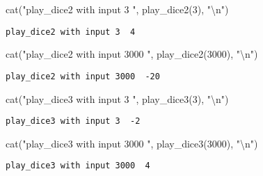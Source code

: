 \documentclass[
  letterpaper,
  DIV=11,
  numbers=noendperiod]{scrartcl}
\newenvironment{Shaded}{\begin{snugshade}}{\end{snugshade}}
\newcommand{\DecValTok}[1]{\textcolor[rgb]{0.68,0.00,0.00}{#1}}
\newcommand{\FunctionTok}[1]{\textcolor[rgb]{0.28,0.35,0.67}{#1}}
\newcommand{\NormalTok}[1]{\textcolor[rgb]{0.00,0.23,0.31}{#1}}
\newcommand{\SpecialCharTok}[1]{\textcolor[rgb]{0.37,0.37,0.37}{#1}}
\newcommand{\StringTok}[1]{\textcolor[rgb]{0.13,0.47,0.30}{#1}}
\begin{document}
\begin{Shaded}
\begin{Highlighting}[]
\FunctionTok{cat}\NormalTok{(}\StringTok{"play\_dice2 with input 3 "}\NormalTok{, }\FunctionTok{play\_dice2}\NormalTok{(}\DecValTok{3}\NormalTok{), }\StringTok{"}\SpecialCharTok{\textbackslash{}n}\StringTok{"}\NormalTok{)}
\end{Highlighting}
\end{Shaded}

\begin{verbatim}
play_dice2 with input 3  4 
\end{verbatim}

\begin{Shaded}
\begin{Highlighting}[]
\FunctionTok{cat}\NormalTok{(}\StringTok{"play\_dice2 with input 3000 "}\NormalTok{, }\FunctionTok{play\_dice2}\NormalTok{(}\DecValTok{3000}\NormalTok{), }\StringTok{"}\SpecialCharTok{\textbackslash{}n}\StringTok{"}\NormalTok{)}
\end{Highlighting}
\end{Shaded}

\begin{verbatim}
play_dice2 with input 3000  -20 
\end{verbatim}

\begin{Shaded}
\begin{Highlighting}[]
\FunctionTok{cat}\NormalTok{(}\StringTok{"play\_dice3 with input 3 "}\NormalTok{, }\FunctionTok{play\_dice3}\NormalTok{(}\DecValTok{3}\NormalTok{), }\StringTok{"}\SpecialCharTok{\textbackslash{}n}\StringTok{"}\NormalTok{)}
\end{Highlighting}
\end{Shaded}

\begin{verbatim}
play_dice3 with input 3  -2 
\end{verbatim}

\begin{Shaded}
\begin{Highlighting}[]
\FunctionTok{cat}\NormalTok{(}\StringTok{"play\_dice3 with input 3000 "}\NormalTok{, }\FunctionTok{play\_dice3}\NormalTok{(}\DecValTok{3000}\NormalTok{), }\StringTok{"}\SpecialCharTok{\textbackslash{}n}\StringTok{"}\NormalTok{)}
\end{Highlighting}
\end{Shaded}

\begin{verbatim}
play_dice3 with input 3000  4 
\end{verbatim}
\end{document}
